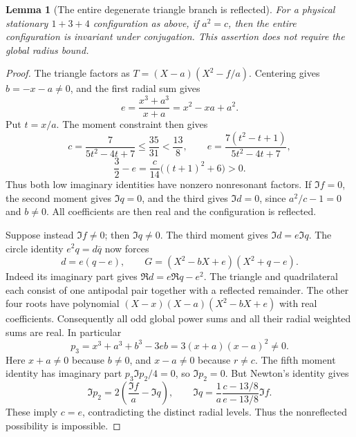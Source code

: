 \documentclass[11pt,a4paper]{article}
\newtheorem{lemma}[theorem]{Lemma}
\theoremstyle{remark}
\begin{document}
\begin{lemma}[The entire degenerate triangle branch is reflected]
\label{lem:134-new-degenerate-reflected}
For a physical stationary \(1+3+4\) configuration as above, if
\(a^2=c\), then the entire configuration is invariant under conjugation.
This assertion does not require the global radius bound.
\end{lemma}
\begin{proof}
The triangle factors as \(T=(X-a)(X^2-f/a)\). Centering gives
\(b=-x-a\ne0\), and the first radial sum gives
\[
 e=\frac{x^3+a^3}{x+a}=x^2-xa+a^2.
\]
Put \(t=x/a\). The moment constraint then gives
\[
 c=\frac7{5t^2-4t+7}\le\frac{35}{31}<\frac{13}{8},\qquad
 e=\frac{7(t^2-t+1)}{5t^2-4t+7},
\]
\[
 \frac32-e=\frac{c}{14}\bigl((t+1)^2+6\bigr)>0.
\]
Thus both low imaginary identities have nonzero nonresonant factors.
If \(\Im f=0\), the second moment gives \(\Im q=0\), and the third
gives \(\Im d=0\), since \(a^2/c-1=0\) and \(b\ne0\).
All coefficients are then real and the configuration is reflected.

Suppose instead \(\Im f\ne0\); then \(\Im q\ne0\). The third
moment gives \(\Im d=e\Im q\). The circle identity
\(e^2q=d\overline q\) now forces
\[
 d=e(q-e),\qquad
 G=(X^2-bX+e)(X^2+q-e).
\]
Indeed its imaginary part gives \(\Re d=e\Re q-e^2\).
The triangle and quadrilateral each consist of one antipodal pair
together with a reflected remainder. The other four roots have
polynomial \((X-x)(X-a)(X^2-bX+e)\) with real coefficients.
Consequently all odd global power sums and all their radial weighted
sums are real. In particular
\[
 p_3=x^3+a^3+b^3-3eb=3(x+a)(x-a)^2\ne0.
\]
Here \(x+a\ne0\) because \(b\ne0\), and \(x-a\ne0\) because
\(r\ne c\). The fifth moment identity has imaginary part
\(p_3\Im p_2/4=0\), so \(\Im p_2=0\).
But Newton's identity gives
\[
 \Im p_2=2\left(\frac{\Im f}{a}-\Im q\right),\qquad
 \Im q=\frac1a\frac{c-13/8}{e-13/8}\Im f.
\]
These imply \(c=e\), contradicting the distinct radial levels.
Thus the nonreflected possibility is impossible.
\end{proof}
\end{document}
